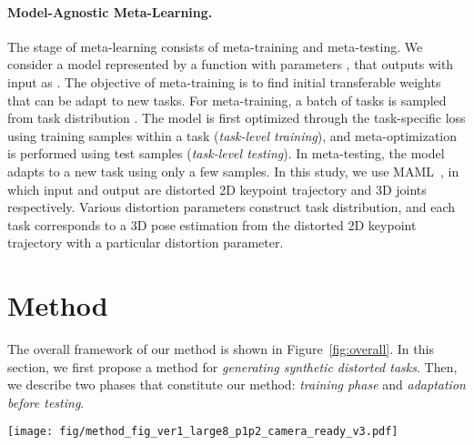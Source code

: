     \paragraph{Model-Agnostic Meta-Learning.}
        The stage of meta-learning consists of meta-training and meta-testing. We consider a model represented by a function  with parameters , that outputs  with input as . The objective of meta-training is to find initial transferable weights that can be adapt to new tasks. For meta-training, a batch of tasks  is sampled from task distribution . The model is first optimized through the task-specific loss  using training samples within a task (\textit{task-level training}), and meta-optimization is performed using test samples (\textit{task-level testing}). In meta-testing, the model adapts to a new task  using only a few samples. In this study, we use MAML~\cite{ref20_pmlr-v70-finn17a}, in which input  and output  are distorted 2D keypoint trajectory and 3D joints respectively. Various distortion parameters construct task distribution, and each task corresponds to a 3D pose estimation from the distorted 2D keypoint trajectory with a particular distortion parameter.
\vspace{-1mm}


\section{Method}
    \vspace{-1mm}
    The overall framework of our method is shown in Figure~\ref{fig:overall}. In this section, we first propose a method for \textit{generating synthetic distorted tasks}. Then, we describe two phases that constitute our method: \textit{training phase} and \textit{adaptation before testing}.
    \vspace{-1mm}
    \begin{figure*}
        \begin{center}
            \texttt{[image: fig/method\_fig\_ver1\_large8\_p1p2\_camera\_ready\_v3.pdf]}
        \end{center}
        \vspace{-4.5mm}
        \caption{Overall framework of our methods. (a) We train a 2D-keypoint-conditioned 3D pose estimator that can quickly adapt to any distortions using only an undistorted large-scale dataset. Before the trained network can be used in practice, it must be adapted to a certain distortion. (b) and (c) represent adaptation method for \small \normalsize and \small\normalsize, respectively.}
        \vspace{-1mm}
        \label{fig:overall}
        \vspace{-2.5mm}
    \end{figure*}
    
